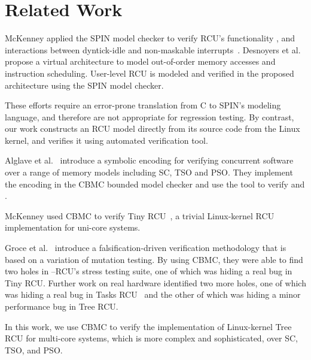 \section{Related Work}
%
McKenney applied the SPIN model checker to verify RCU's 
functionality \cite{VerificationChallenges},
and interactions between dyntick-idle and 
non-maskable interrupts~\cite{ValDyntickNMI}. 
%
Desnoyers et al.~\cite{DesnoyersOSR13} propose a virtual architecture 
to model out-of-order memory accesses and instruction scheduling.
User-level RCU \cite{DesnoyersTPDS12UserRCU} is modeled and verified 
in the proposed architecture using the SPIN model checker. 

These efforts require an error-prone translation from C to SPIN's 
modeling language, and therefore are not appropriate for regression testing. 
By contrast, our work constructs an RCU model directly from its 
source code from the Linux kernel, and verifies it using automated 
verification tool. 

Alglave et al.~\cite{AlglaveCAV13} introduce a symbolic encoding 
for verifying concurrent software over a range of memory models 
including SC, TSO and PSO.
They implement the encoding in the CBMC bounded model checker and 
use the tool to verify  and .

McKenney used CBMC to verify Tiny
RCU~\cite{VerificationChallenges}, a trivial Linux-kernel
RCU implementation for uni-core systems.

Groce et al.~\cite{GroceASE15RCU} introduce a falsification-driven
verification methodology that is based on a variation of mutation 
testing. By using CBMC, they were able to find two holes in 
--RCU's stress testing suite, one of which was hiding 
a real bug in Tiny RCU.
Further work on real hardware identified two more
 holes, one of which was hiding a real bug in Tasks
RCU~\cite{JonathanCorbet2014RCU-tasks} and the other of which was hiding
a minor performance bug in Tree RCU.

In this work, we use CBMC to verify the implementation of Linux-kernel
Tree RCU for multi-core systems, which is more complex
and sophisticated, over SC, TSO, and PSO.

